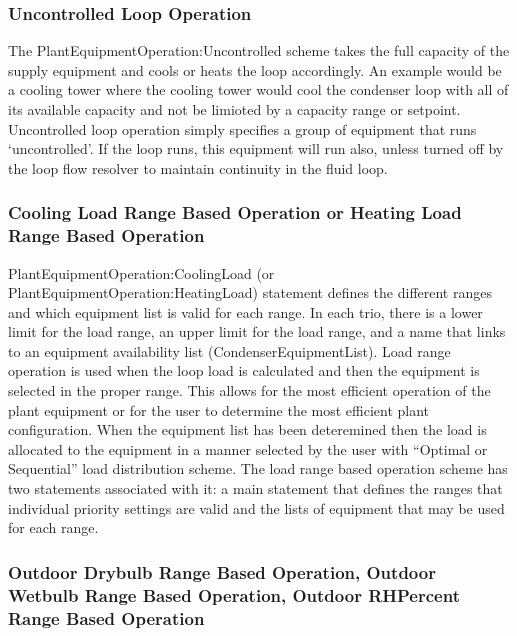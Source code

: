 \subsubsection{Uncontrolled Loop Operation}\label{uncontrolled-loop-operation-1}

The PlantEquipmentOperation:Uncontrolled scheme takes the full capacity of the supply equipment and cools or heats the loop accordingly. An example would be a cooling tower where the cooling tower would cool the condenser loop with all of its available capacity and not be limioted by a capacity range or setpoint. Uncontrolled loop operation simply specifies a group of equipment that runs `uncontrolled'. If the loop runs, this equipment will run also, unless turned off by the loop flow resolver to maintain continuity in the fluid loop.

\subsubsection{Cooling Load Range Based Operation or Heating Load Range Based Operation}\label{cooling-load-range-based-operation-or-heating-load-range-based-operation-1}

PlantEquipmentOperation:CoolingLoad (or PlantEquipmentOperation:HeatingLoad) statement defines the different ranges and which equipment list is valid for each range. In each trio, there is a lower limit for the load range, an upper limit for the load range, and a name that links to an equipment availability list (CondenserEquipmentList). Load range operation is used when the loop load is calculated and then the equipment is selected in the proper range. This allows for the most efficient operation of the plant equipment or for the user to determine the most efficient plant configuration. When the equipment list has been deteremined then the load is allocated to the equipment in a manner selected by the user with ``Optimal or Sequential'' load distribution scheme. The load range based operation scheme has two statements associated with it: a main statement that defines the ranges that individual priority settings are valid and the lists of equipment that may be used for each range.

\subsubsection{Outdoor Drybulb Range Based Operation, Outdoor Wetbulb Range Based Operation, Outdoor RHPercent Range Based Operation}\label{outdoor-drybulb-range-based-operation-outdoor-wetbulb-range-based-operation-outdoor-rhpercent-range-based-operation-1}

